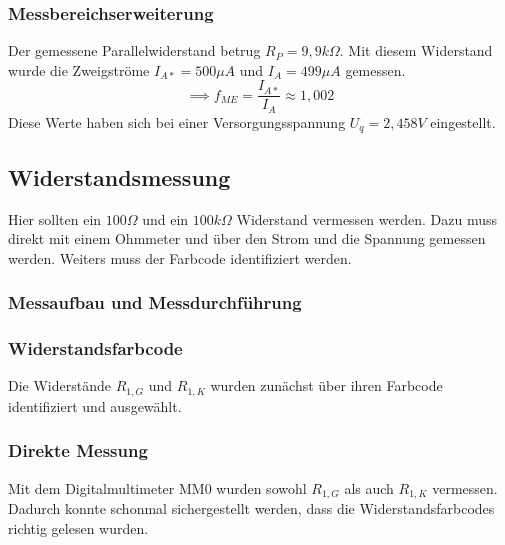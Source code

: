 \documentclass[a4paper]{article}
\begin{document}
\subsubsection*{Messbereichserweiterung}
Der gemessene Parallelwiderstand betrug $R_{P}=9,9\unit{k\Omega}$.
Mit diesem Widerstand wurde die Zweigströme $I_{A*}=500\unit{\mu A}$ und
$I_{A}=499\unit{\mu A}$ gemessen.
\[ \implies f_{ME}=\frac{I_{A*}}{I_{A}}\approx 1,002 \]
Diese Werte haben sich bei einer Versorgungsspannung $U_{q}=2,458\unit{V}$ eingestellt.

\subsection{Widerstandsmessung}
Hier sollten ein $100\unit{\Omega}$ und ein $100 \unit{k\Omega}$ Widerstand vermessen werden.
Dazu muss direkt mit einem Ohmmeter und über den Strom und die Spannung gemessen
werden. Weiters muss der Farbcode identifiziert werden.

\subsubsection{Messaufbau und Messdurchführung}
\subsubsection*{\textbf{Widerstandsfarbcode}}
Die Widerstände $R_{1,G}$ und $R_{1,K}$ wurden zunächst über ihren Farbcode identifiziert und ausgewählt.

\subsubsection*{Direkte Messung}
Mit dem Digitalmultimeter MM0 wurden sowohl $R_{1,G}$ als auch $R_{1,K}$ vermessen.
Dadurch konnte schonmal sichergestellt werden, dass die Widerstandsfarbcodes richtig
gelesen wurden.
\end{document}
